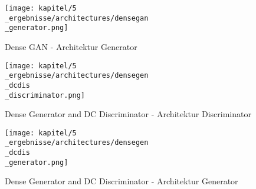 \begin{figure}[H]
	\centering
	\texttt{[image: kapitel/5\\\_ergebnisse/architectures/densegan\\\_generator.png]}
	\caption{Dense GAN - Architektur Generator}
	\label{architecture:densegan-gen}
\end{figure}

\begin{figure}[H]
	\centering
	\texttt{[image: kapitel/5\\\_ergebnisse/architectures/densegen\\\_dcdis\\\_discriminator.png]}
	\caption{Dense Generator and DC Discriminator - Architektur Discriminator}
	\label{architecture:densegen-dcdis-dis}
\end{figure}

\begin{figure}[H]
	\centering
	\texttt{[image: kapitel/5\\\_ergebnisse/architectures/densegen\\\_dcdis\\\_generator.png]}
	\caption{Dense Generator and DC Discriminator - Architektur Generator}
	\label{architecture:densegen-dcdis-gen}
\end{figure}
